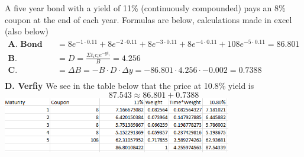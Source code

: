 \documentclass[12pt]{article}
\newenvironment{problem}[3][Problem]{\begin{trivlist}
\item[\hskip \labelsep {\bfseries #1}\hskip \labelsep {\bfseries #2.}]}{\end{trivlist}}
\begin{document}
\begin{problem}{4.22}. A five year bond with a yield of 11\% (continuously compounded) pays an 8\% coupon at the end of each year. Formulas are below, calculations made in excel (also below) \\
\begin{align*}
\textbf{A. Bond Price} &= 8e^{-1\cdot0.11} + 8e^{-2\cdot0.11} + 8e^{-3\cdot0.11} + 8e^{-4\cdot0.11} + 108e^{-5\cdot0.11} = 86.801\\
\textbf{B. Duration} &= D = \frac{\Sigma t_ic_ie^{-yt_i}}{B}  = 4.256 \\
\textbf{C. Change in Yield} &= \Delta B = -B \cdot D \cdot \Delta y = -86.801 \cdot 4.256 \cdot -0.002 = 0.7388 \\
\end{align*}
\textbf{D. Verfiy} We see in the table below that the price at 10.8\% yield is $$87.543 \approx 86.801 + 0.7388$$
\includegraphics[width=0.75\textwidth]{mod3_p422.png}
\end{problem}
\end{document}
